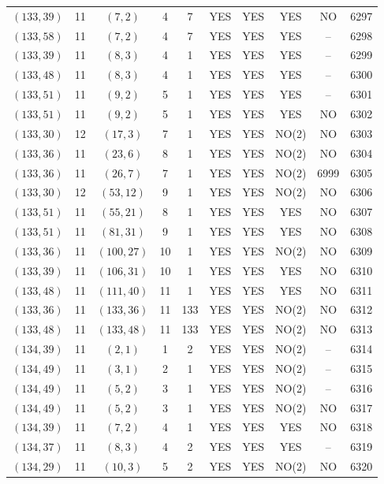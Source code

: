 \begin{longtable}{|c|c|c|c|c|c|c|c|c|c|}
$(133, 39)$ & 11 & $(7, 2)$ & 4 & 7 & YES & YES & YES & NO & 6297\\
$(133, 58)$ & 11 & $(7, 2)$ & 4 & 7 & YES & YES & YES & -- & 6298\\
$(133, 39)$ & 11 & $(8, 3)$ & 4 & 1 & YES & YES & YES & -- & 6299\\
$(133, 48)$ & 11 & $(8, 3)$ & 4 & 1 & YES & YES & YES & -- & 6300\\
$(133, 51)$ & 11 & $(9, 2)$ & 5 & 1 & YES & YES & YES & -- & 6301\\
$(133, 51)$ & 11 & $(9, 2)$ & 5 & 1 & YES & YES & YES & NO & 6302\\
$(133, 30)$ & 12 & $(17, 3)$ & 7 & 1 & YES & YES & NO(2) & NO & 6303\\
$(133, 36)$ & 11 & $(23, 6)$ & 8 & 1 & YES & YES & NO(2) & NO & 6304\\
$(133, 36)$ & 11 & $(26, 7)$ & 7 & 1 & YES & YES & NO(2) & 6999 & 6305\\
$(133, 30)$ & 12 & $(53, 12)$ & 9 & 1 & YES & YES & NO(2) & NO & 6306\\
$(133, 51)$ & 11 & $(55, 21)$ & 8 & 1 & YES & YES & YES & NO & 6307\\
$(133, 51)$ & 11 & $(81, 31)$ & 9 & 1 & YES & YES & YES & NO & 6308\\
$(133, 36)$ & 11 & $(100, 27)$ & 10 & 1 & YES & YES & NO(2) & NO & 6309\\
$(133, 39)$ & 11 & $(106, 31)$ & 10 & 1 & YES & YES & YES & NO & 6310\\
$(133, 48)$ & 11 & $(111, 40)$ & 11 & 1 & YES & YES & YES & NO & 6311\\
$(133, 36)$ & 11 & $(133, 36)$ & 11 & 133 & YES & YES & NO(2) & NO & 6312\\
$(133, 48)$ & 11 & $(133, 48)$ & 11 & 133 & YES & YES & NO(2) & NO & 6313\\
$(134, 39)$ & 11 & $(2, 1)$ & 1 & 2 & YES & YES & NO(2) & -- & 6314\\
$(134, 49)$ & 11 & $(3, 1)$ & 2 & 1 & YES & YES & NO(2) & -- & 6315\\
$(134, 49)$ & 11 & $(5, 2)$ & 3 & 1 & YES & YES & NO(2) & -- & 6316\\
$(134, 49)$ & 11 & $(5, 2)$ & 3 & 1 & YES & YES & NO(2) & NO & 6317\\
$(134, 39)$ & 11 & $(7, 2)$ & 4 & 1 & YES & YES & YES & NO & 6318\\
$(134, 37)$ & 11 & $(8, 3)$ & 4 & 2 & YES & YES & YES & -- & 6319\\
$(134, 29)$ & 11 & $(10, 3)$ & 5 & 2 & YES & YES & NO(2) & NO & 6320\\

\end{longtable}
